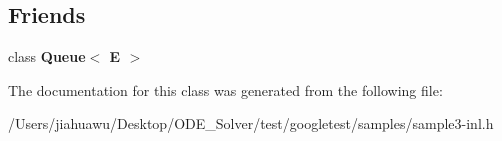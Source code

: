 \subsection*{Friends}
\begin{DoxyCompactItemize}
\item 
\mbox{\label{class_queue_node_ad4336229b1d7c3626e4ba69f236b202d}} 
class {\bfseries Queue$<$ E $>$}
\end{DoxyCompactItemize}


The documentation for this class was generated from the following file\+:\begin{DoxyCompactItemize}
\item 
/\+Users/jiahuawu/\+Desktop/\+O\+D\+E\+\_\+\+Solver/test/googletest/samples/sample3-\/inl.\+h\end{DoxyCompactItemize}
